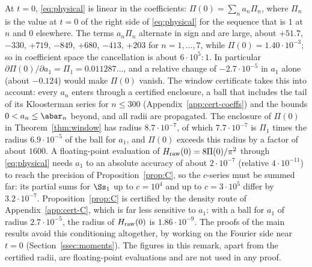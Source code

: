 \begin{remark}\label{rem:conditioning}
At $t=0$, \eqref{eq:physical} is linear in the coefficients: $\Pi(0)=\sum_na_n\Pi_n$, where $\Pi_n$ is the value at $t=0$ of the right side of
\eqref{eq:physical} for the sequence that is $1$ at $n$ and $0$ elsewhere. The terms $a_n\Pi_n$ alternate in sign and are large, about $+51.7$, $-330$, $+719$, $-849$, $+680$, $-413$,
$+203$ for $n=1,\dots,7$, while $\Pi(0)=1.40\cdot10^{-3}$; so in coefficient space the cancellation is about $6\cdot10^5:1$. In particular
$\partial\Pi(0)/\partial a_1=\Pi_1=0.011287\ldots$, and a relative change of $-2.7\cdot10^{-5}$ in $a_1$ alone (about $-0.124$) would make $\Pi(0)$
vanish. The window certificate takes this into account: every $a_n$ enters through a certified enclosure, a ball that includes the tail of its
Kloosterman series for $n\le300$ (Appendix~\ref{app:cert-coeffs}) and the bounds $0<a_n\le\abar_n$ beyond, and all radii are propagated. The enclosure of $\Pi(0)$ in Theorem~\ref{thm:window} has radius
$8.7\cdot10^{-7}$, of which $7.7\cdot10^{-7}$ is $\Pi_1$ times the radius $6.9\cdot10^{-5}$ of the ball for $a_1$, and $\Pi(0)$ exceeds this
radius by a factor of about $1600$. A floating-point evaluation of $H_{\rm raw}(0)=8\Pi(0)/\pi^2$ through \eqref{eq:physical} needs $a_1$ to an
absolute accuracy of about $2\cdot10^{-7}$ (relative $4\cdot10^{-11}$) to reach the precision of Proposition~\ref{prop:C}, so the $c$-series
must be summed far: its partial sums for $\Ss_1$ up to $c=10^4$ and up to $c=3\cdot10^5$ differ by $3.2\cdot10^{-7}$. Proposition~\ref{prop:C} is certified by the density route of Appendix~\ref{app:cert-C}, which is far less sensitive to
$a_1$: with a ball for $a_1$ of radius $2.7\cdot10^{-5}$, the radius of $H_{\rm raw}(0)$ is $1.86\cdot10^{-9}$. The proofs of the main results
avoid this conditioning altogether, by working on the Fourier side near $t=0$ (Section~\ref{ssec:moments}). The figures in this remark, apart from
the certified radii, are floating-point evaluations and are not used in any proof.
\end{remark}

